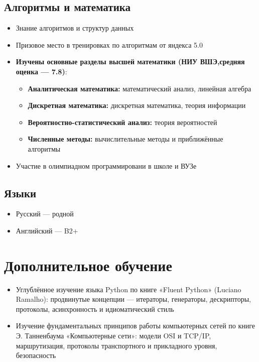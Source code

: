 \documentclass[a4paper,12pt]{article}
\begin{document}
	\subsection*{Алгоритмы и математика}
	\begin{itemize}[leftmargin=1.5em]
		\item Знание алгоритмов и структур данных
		\item Призовое место в тренировках по алгоритмам от яндекса 5.0
		\item \textbf{Изучены основные разделы высшей математики (НИУ ВШЭ,средняя оценка — 7.8)}:
		\begin{itemize}
			\item \textbf{Аналитическая математика:} математический анализ, линейная алгебра
			\item \textbf{Дискретная математика:} дискретная математика, теория информации
			\item \textbf{Вероятностно-статистический анализ:} теория вероятностей
			\item \textbf{Численные методы:} вычислительные методы и приближённые алгоритмы
		\end{itemize}
		\item  Участие в олимпиадном программировани в школе и ВУЗе
		
		
	\end{itemize}
	
	\subsection*{Языки}
	\begin{itemize}[leftmargin=1.5em]
		\item Русский — родной
		\item Английский — B2+
	\end{itemize}
	
\section*{Дополнительное обучение}
\begin{itemize}
	\item Углублённое изучение языка Python по книге «Fluent Python» (Luciano Ramalho): продвинутые концепции — итераторы, генераторы, дескрипторы, протоколы, асинхронность и идиоматический стиль
	\item Изучение фундаментальных принципов работы компьютерных сетей по книге Э. Танненбаума «Компьютерные сети»: модели OSI и TCP/IP, маршрутизация, протоколы транспортного и прикладного уровня, безопасность
\end{itemize}
\end{document}
